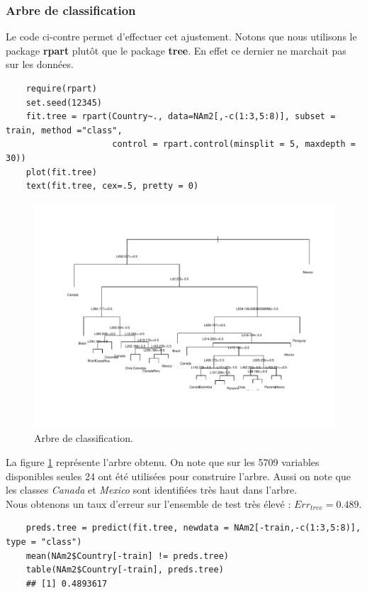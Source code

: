 \documentclass[12pt,a4paper]{article}
\begin{document}
\subsubsection{Arbre de classification}
Le code ci-contre permet d'effectuer cet ajustement. Notons que nous utilisons le package \textbf{rpart} plutôt que le package \textbf{tree}. En effet ce dernier ne marchait pas sur les données.
\begin{lstlisting}
	require(rpart)
	set.seed(12345)
	fit.tree = rpart(Country~., data=NAm2[,-c(1:3,5:8)], subset = train, method ="class",
	                 control = rpart.control(minsplit = 5, maxdepth = 30))
	plot(fit.tree)
	text(fit.tree, cex=.5, pretty = 0)
\end{lstlisting}
\begin{figure}[h!]
	\begin{center}
		\includegraphics[scale=0.8]{figures/tree.pdf}
		\caption{Arbre de classification.}
		\label{fig:tree}
	\end{center}
\end{figure}
La figure \ref{fig:tree} représente l'arbre obtenu. On note que sur les 5709 variables disponibles seules 24 ont été utilisées pour construire l'arbre. Aussi on note que les classes \textit{Canada} et \textit{Mexico} sont identifiées très haut dans l'arbre.\\
Nous obtenons un taux d'erreur sur l'ensemble de test très élevé : \hspace{5mm}$Err_{tree} = 0.489$. \vspace{2mm}
\begin{lstlisting}
	preds.tree = predict(fit.tree, newdata = NAm2[-train,-c(1:3,5:8)], type = "class")
	mean(NAm2$Country[-train] != preds.tree)
	table(NAm2$Country[-train], preds.tree)
	## [1] 0.4893617
\end{lstlisting}
\end{document}
